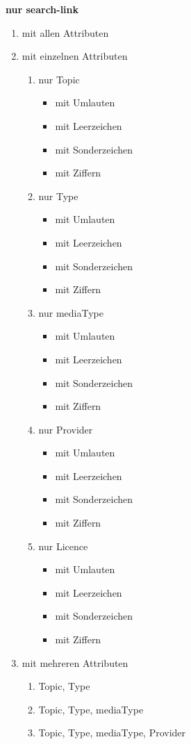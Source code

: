 \pagebreak


\flushleft \textbf{nur search-link}

\begin{enumerate}
  \item mit allen Attributen
  \item mit einzelnen Attributen

   \begin{enumerate}
    \item nur Topic  
    \begin{itemize}
    \item mit Umlauten
    \item mit Leerzeichen
    \item mit Sonderzeichen
    \item mit Ziffern
\end{itemize}
	\item nur Type
 	\begin{itemize}
    \item mit Umlauten
    \item mit Leerzeichen
    \item mit Sonderzeichen
    \item mit Ziffern
\end{itemize}
	\item nur mediaType
	\begin{itemize}
    \item mit Umlauten
    \item mit Leerzeichen
    \item mit Sonderzeichen
    \item mit Ziffern
    \end{itemize}
    \item nur Provider
	\begin{itemize}
    \item mit Umlauten
    \item mit Leerzeichen
    \item mit Sonderzeichen
    \item mit Ziffern
    \end{itemize}
    \item nur Licence
	\begin{itemize}
    \item mit Umlauten
    \item mit Leerzeichen
    \item mit Sonderzeichen
    \item mit Ziffern
    \end{itemize}
\end{enumerate}
\item mit mehreren Attributen
\begin{enumerate}
    \item Topic, Type
	 \item Topic, Type, mediaType
	 \item Topic, Type, mediaType, Provider
\end{enumerate}
\end{enumerate}


